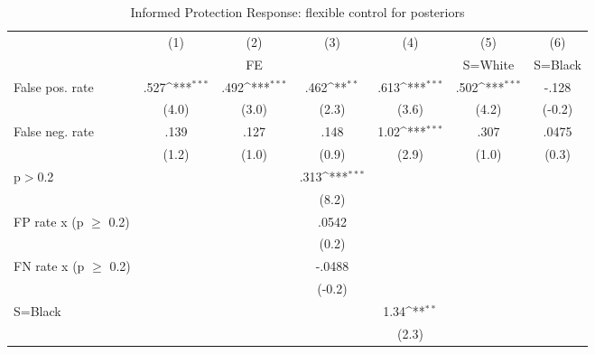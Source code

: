 \begin{table}[htbp]\centering
\def\sym#1{\ifmmode^{#1}\else\(^{#1}\)\fi}
\caption{Informed Protection Response: flexible control for posteriors}
\begin{tabular}{l*{6}{c}}
\hline\hline
                &\multicolumn{1}{c}{(1)}&\multicolumn{1}{c}{(2)}&\multicolumn{1}{c}{(3)}&\multicolumn{1}{c}{(4)}&\multicolumn{1}{c}{(5)}&\multicolumn{1}{c}{(6)}\\
                &\multicolumn{1}{c}{}&\multicolumn{1}{c}{FE}&\multicolumn{1}{c}{}&\multicolumn{1}{c}{}&\multicolumn{1}{c}{S=White}&\multicolumn{1}{c}{S=Black}\\
\hline
False pos. rate &     .527\sym{***}&     .492\sym{***}&     .462\sym{**} &     .613\sym{***}&     .502\sym{***}&    -.128         \\
                &    (4.0)         &    (3.0)         &    (2.3)         &    (3.6)         &    (4.2)         &   (-0.2)         \\
False neg. rate &     .139         &     .127         &     .148         &     1.02\sym{***}&     .307         &    .0475         \\
                &    (1.2)         &    (1.0)         &    (0.9)         &    (2.9)         &    (1.0)         &    (0.3)         \\
p$>$0.2         &                  &                  &     .313\sym{***}&                  &                  &                  \\
                &                  &                  &    (8.2)         &                  &                  &                  \\
FP rate x (p $\geq$ 0.2)&                  &                  &    .0542         &                  &                  &                  \\
                &                  &                  &    (0.2)         &                  &                  &                  \\
FN rate x (p $\geq$ 0.2)&                  &                  &   -.0488         &                  &                  &                  \\
                &                  &                  &   (-0.2)         &                  &                  &                  \\
S=Black         &                  &                  &                  &     1.34\sym{**} &                  &                  \\
                &                  &                  &                  &    (2.3)         &                  &                  \\

\end{tabular}
\end{table}
